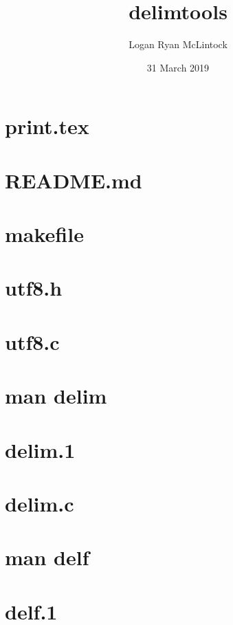 \documentclass[titlepage, a4paper]{article}
\title{delimtools}
\date {31 March 2019}
\author{Logan Ryan McLintock}
\begin{document}
\maketitle

\tableofcontents
\newpage

\section{print.tex}
\newpage

\section{README.md}
\newpage

\section{makefile}
\newpage

\section{utf8.h}
\newpage

\section{utf8.c}
\newpage

\section{man delim}


\section{delim.1}
\newpage

\section{delim.c}
\newpage

\section{man delf}


\section{delf.1}
\newpage
\end{document}
